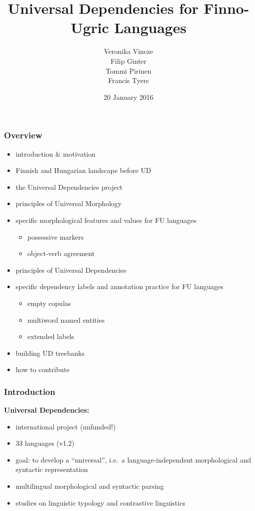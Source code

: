 \documentclass{beamer}
\title[UD for Finno-Ugric Languages]{\textbf{Universal Dependencies for Finno-Ugric Languages}} %
\author[]{Veronika Vincze\\
Filip Ginter\\
Tommi Pirinen\\
Francis Tyers} %
\institute%
[]{
University of Szeged\\ 
University of Turku\\
Dublin City University\\
University of Troms\o\\%
\textit{vinczev@inf.u-szeged.hu, figint@utu.fi\\
tommi.pirinen@computing.dcu.ie, francis.tyers@uit.no \\
}}
\date{20 January 2016} %
\begin{document}
\begin{frame}
\titlepage %
\end{frame}

\begin{frame}
\frametitle{Overview}
\begin{itemize}
\item introduction \& motivation
\item Finnish and Hungarian landscape before UD
\item the Universal Dependencies project
\item principles of Universal Morphology
\item specific morphological features and values for FU languages
\begin{itemize}
	\item possessive markers
	\item object-verb agreement
\end{itemize}
\item principles of Universal Dependencies
\item specific dependency labels and annotation practice for FU languages
\begin{itemize}
	\item empty copulas
	\item multiword named entities
	\item extended labels
\end{itemize}
\item building UD treebanks
\item how to contribute
\end{itemize}
\end{frame}


\begin{frame}
\frametitle{Introduction}
\textbf{Universal Dependencies:}
\begin{itemize}
\item international project (unfunded!)
\item 33 languages (v1.2)
\item goal: to develop a ``universal'', i.e.~a language-independent morphological and syntactic representation
\item multilingual morphological and syntactic parsing
\item studies on linguistic typology and contrastive linguistics
\end{itemize}
\end{frame}
\end{document}
